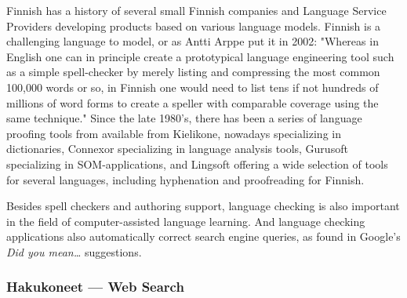 \documentclass[]{../../metanetpaper}
\begin{document}
\begin{Parallel}[c]{70mm}{70mm}
{%

% 
% 
% 
% 
% 
% 
% 
% 
% 
% 
% 

Finnish has a history of several small Finnish companies and Language
Service Providers developing products based on various language
models. Finnish is a challenging language to model, or as Antti Arppe
put it in 2002: "Whereas in English one can in principle create a
prototypical language engineering tool such as a simple spell-checker
by merely listing and compressing the most common 100,000 words or so,
in Finnish one would need to list tens if not hundreds of millions of
word forms to create a speller with comparable coverage using the same
technique." \cite{NoPath} Since the late 1980's, there has been a
series of language proofing tools from available from Kielikone,
nowadays specializing in dictionaries, Connexor specializing in
language analysis tools, Gurusoft specializing in SOM-applications,
and Lingsoft offering a wide selection of tools for several languages,
including hyphenation and proofreading for Finnish.

Besides spell checkers and authoring support, language checking is
also important in the field of computer-assisted language
learning. And language checking applications also automatically
correct search engine queries, as found in Google's \textit{Did you
mean\dots} suggestions.
}

\ParallelPar

\subsubsection{Hakukoneet --- Web Search}


\end{Parallel}
\end{document}
